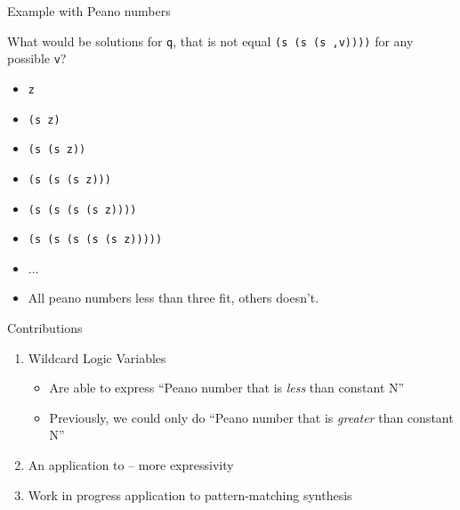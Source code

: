\documentclass[aspectratio=169
  , xcolor={svgnames}
  , hyperref=
      { colorlinks
      , urlcolor=DarkBlue
      }
  , russian  %
  ]{beamer}
\begin{document}
\begin{frame}{Example with Peano numbers}

What would be solutions for \texttt{q}, that is not equal \texttt{(s (s (s ,v))))} for any possible \texttt{v}?

\begin{itemize}
\item[\faGood] \texttt{z}
\item[\faGood] \texttt{(s z)}
\item[\faGood] \texttt{(s (s z))}
\item[\faBad] \texttt{(s (s (s z)))}
\item[\faBad] \texttt{(s (s (s (s z))))}
\item[\faBad] \texttt{(s (s (s (s (s z)))))}
\item ...
\item All peano numbers less than three fit, others doesn't.
\end{itemize}

\end{frame}
\begin{frame}{Contributions}
\begin{enumerate}


\item Wildcard Logic Variables
\begin{itemize}
\item Are able to express ``Peano number that is \emph{less} than constant N''
\item Previously, we could only do ``Peano number that is  \emph{greater} than constant N''
\end{itemize}
\item An application to \noCanren{} -- more expressivity
\item Work in progress application to pattern-matching synthesis
\end{enumerate}
\end{frame}
\end{document}
